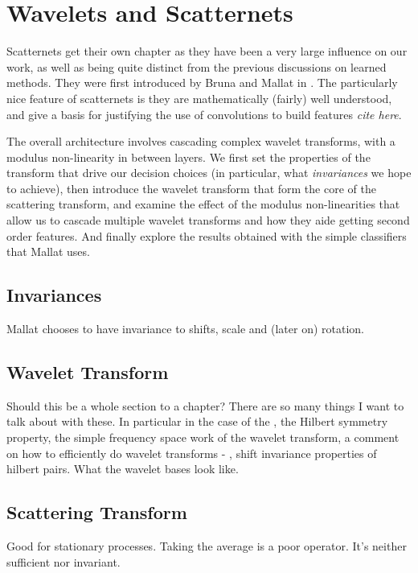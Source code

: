 \chapter{Wavelets and Scatternets}\label{ch:spec_background}
Scatternets get their own chapter as they have been a very large influence on
our work, as well as being quite distinct from the previous discussions on
learned methods. They were first introduced by Bruna and Mallat in
\cite{bruna_invariant_2013}. The particularly nice feature of scatternets is
they are mathematically (fairly) well understood, and give a basis for
justifying the use of convolutions to build features \emph{cite here}. 

The overall architecture involves cascading complex wavelet transforms, with
a modulus non-linearity in between layers. We first set the properties of
the transform that drive our decision choices (in particular, what
\emph{invariances} we hope to achieve), then introduce the wavelet
transform that form the core of the scattering transform, and examine the
effect of the modulus non-linearities that allow us to cascade multiple wavelet
transforms and how they aide getting second order features. And finally explore the
results obtained with the simple classifiers that Mallat uses.

\section{Invariances}
Mallat chooses to have invariance to shifts, scale and (later on) rotation. 

\section{Wavelet Transform}
Should this be a whole section to a chapter? There are so many things I want to
talk about with these. In particular in the case of the \DTCWT, the Hilbert
symmetry property, the simple frequency space work of the wavelet transform,
a comment on how to efficiently do wavelet transforms - \DTCWT, shift
invariance properties of hilbert pairs. What the wavelet bases look like. 

\section{Scattering Transform}
Good for stationary processes. Taking the average is a poor operator. It's
neither sufficient nor invariant.

